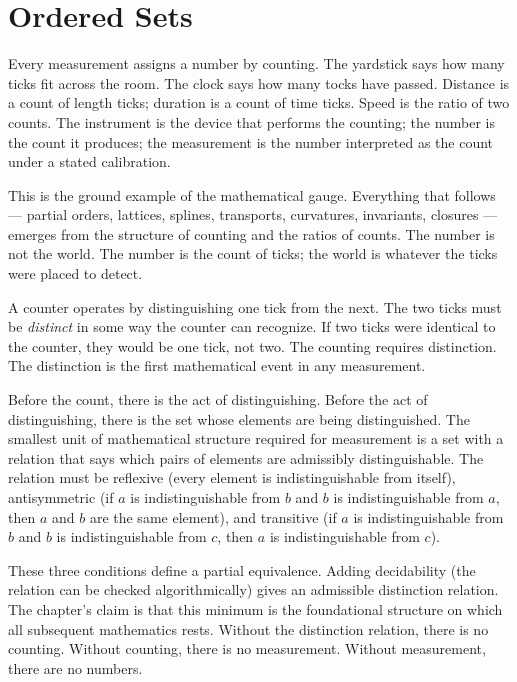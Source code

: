 \chapter{Ordered Sets}
\label{chap:ordered-sets}


\begin{chapteressay}

Every measurement assigns a number by counting. The yardstick says how many
ticks fit across the room. The clock says how many tocks have passed.
Distance is a count of length ticks; duration is a count of time ticks.
Speed is the ratio of two counts. The instrument is the device that
performs the counting; the number is the count it produces; the
measurement is the number interpreted as the count under a stated
calibration.

This is the ground example of the mathematical gauge. Everything that
follows --- partial orders, lattices, splines, transports, curvatures,
invariants, closures --- emerges from the structure of counting and the
ratios of counts. The number is not the world. The number is the count of
ticks; the world is whatever the ticks were placed to detect.

A counter operates by distinguishing one tick from the next. The two ticks
must be \emph{distinct} in some way the counter can recognize. If two ticks
were identical to the counter, they would be one tick, not two. The
counting requires distinction. The distinction is the first mathematical
event in any measurement.

Before the count, there is the act of distinguishing. Before the act of
distinguishing, there is the set whose elements are being distinguished.
The smallest unit of mathematical structure required for measurement is a
set with a relation that says which pairs of elements are admissibly
distinguishable. The relation must be reflexive (every element is
indistinguishable from itself), antisymmetric (if $a$ is indistinguishable
from $b$ and $b$ is indistinguishable from $a$, then $a$ and $b$ are the
same element), and transitive (if $a$ is indistinguishable from $b$ and
$b$ is indistinguishable from $c$, then $a$ is indistinguishable from
$c$).

These three conditions define a partial equivalence. Adding decidability
(the relation can be checked algorithmically) gives an admissible
distinction relation. The chapter's claim is that this minimum is the
foundational structure on which all subsequent mathematics rests. Without
the distinction relation, there is no counting. Without counting, there
is no measurement. Without measurement, there are no numbers.


\end{chapteressay}
